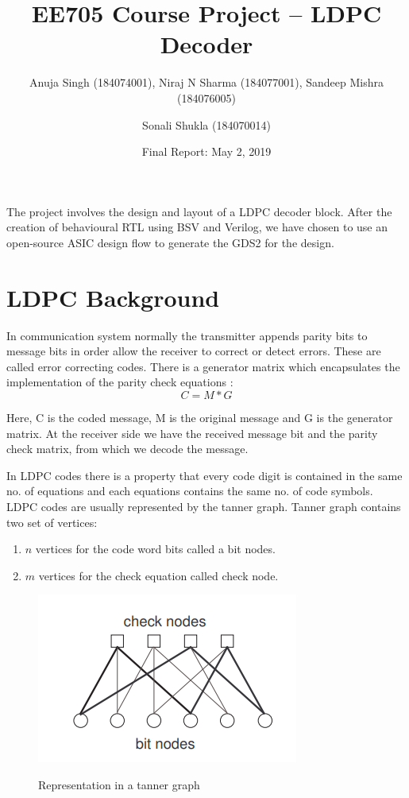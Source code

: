 \documentclass[11pt, a4paper]{article}
\title{EE705 Course Project -- LDPC Decoder}
\author{Anuja Singh (184074001), Niraj N Sharma (184077001), Sandeep Mishra (184076005) \and Sonali Shukla (184070014)}
\date{Final Report: May 2, 2019}
\begin{document}
\maketitle
The project involves the design and layout of a LDPC decoder block. After
the creation of behavioural RTL using BSV and Verilog, we have chosen to use
an open-source ASIC design flow to generate the GDS2 for the design.

\section{LDPC Background}
In communication system normally the transmitter appends parity bits to
message bits in order allow the receiver to correct or detect errors. These
are called error correcting codes. There is a generator matrix which
encapsulates the implementation of the parity check equations :
\[
C = M*G
\]

Here, C is the coded message, M is the original message and G is the generator
matrix. At the receiver side we have the received message bit and the parity
check matrix, from which we decode the message.

In LDPC codes there is a property that every code digit is contained in the
same no. of equations and each equations contains the same no. of code
symbols. LDPC codes are usually represented by the tanner graph. Tanner graph
contains two set of vertices: 
\begin{enumerate}
   \item $n$ vertices for the code word bits called a bit nodes.
   \item $m$ vertices for the check equation called check node.
\end{enumerate}

\begin{figure}[hbt]
\includegraphics{pic2.png}
\label{fig:pic2}
\caption{Representation in a tanner graph}
\end{figure}
\end{document}
